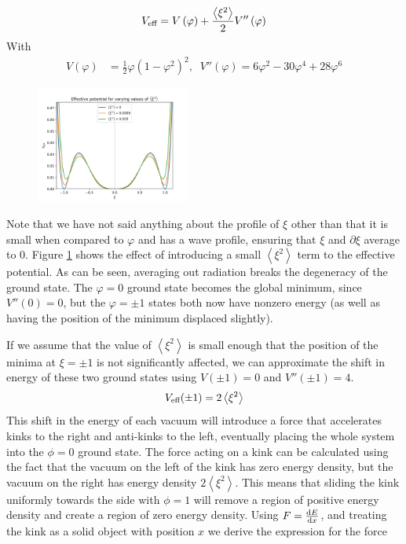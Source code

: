 \documentclass[11pt, oneside]{article}  	%
\numberwithin{equation}{section}
\newcommand{\drv}{\ensuremath{\textup{d}}}
\begin{document}
\begin{equation}
V_\textup{eff} = V\left ( \varphi \right ) + \frac{\left \langle \xi^2 \right \rangle}{2}V''\left ( \varphi \right ) 
\end{equation}
With
\begin{align}
V(\varphi) &= \frac{1}{2} \varphi \left ( 1- \varphi^2 \right )^2, \; \;V''(\varphi) = 6\varphi^2 - 30\varphi^4 + 28\varphi^6
\end{align}
\begin{figure}
\centering
 \includegraphics[width=0.45\textwidth]{potential_averaged.png}
  \label{potential_averaged}
\end{figure}
Note that we have not said anything about the profile of $\xi$ other than that it is small when compared to $\varphi$ and has a wave profile, ensuring that $\xi$ and $\partial \xi$ average to 0. Figure \ref{potential_averaged} shows the effect of introducing a small $\left \langle \xi^2 \right \rangle$ term to the effective potential. As can be seen, averaging out radiation breaks the degeneracy of the ground state. The $\varphi = 0$ ground state becomes the global minimum, since $V''(0) = 0$, but the $\varphi = \pm1$ states both now have nonzero energy (as well as having the position of the minimum displaced slightly).\par
If we assume that the value of $\left \langle \xi^2 \right \rangle$ is small enough that the position of the minima at $\xi = \pm 1$ is not significantly affected, we can approximate the shift in energy of these two ground states using $V(\pm1) = 0$ and $V''(\pm 1) = 4 $.
\begin{equation}
V_{\textup{eff}}(\pm1) = 2 \left \langle \xi^2 \right \rangle
\end{equation}
This shift in the energy of each vacuum will introduce a force that accelerates kinks to the right and anti-kinks to the left, eventually placing the whole system into the $\phi = 0$ ground state. The force acting on a kink can be calculated using the fact that the vacuum on the left of the kink has zero energy density, but the vacuum on the right has energy density $2 \left \langle \xi^2 \right \rangle$. This means that sliding the kink uniformly towards the side with $\phi = 1$ will remove a region of positive energy density and create a region of zero energy density. Using $F = \frac{\drv E}{\drv x}$, and treating the kink as a solid object with position $x$ we derive the expression for the force
\end{document}
